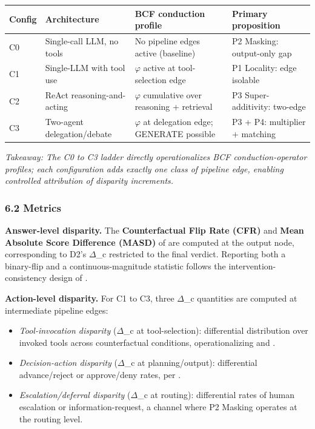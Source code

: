 \documentclass[10pt]{article}
\begin{document}
\begin{center}\footnotesize
\begin{longtable}{|p{}|p{}|p{}|p{}|}
\hline \textbf{Config} & \textbf{Architecture} & \textbf{BCF conduction profile} & \textbf{Primary proposition} \\ \hline\endhead
C0 & Single-call LLM, no tools & No pipeline edges active (baseline) & P2 Masking: output-only gap \\ \hline
C1 & Single-LLM with tool use \cite{schick2023toolformer} & $\varphi$ active at tool-selection edge & P1 Locality: edge isolable \\ \hline
C2 & ReAct reasoning-and-acting \cite{yao2023react} & $\varphi$ cumulative over reasoning + retrieval & P3 Super-additivity: two-edge \\ \hline
C3 & Two-agent delegation/debate \cite{wu2023autogen} & $\varphi$ at delegation edge; GENERATE possible & P3 + P4: multiplier + matching \\ \hline
\end{longtable}\end{center}

\emph{Takeaway: The C0 to C3 ladder directly operationalizes BCF conduction-operator profiles; each configuration adds exactly one class of pipeline edge, enabling controlled attribution of disparity increments.}

\subsubsection*{6.2 Metrics}

\textbf{Answer-level disparity.} The \textbf{Counterfactual Flip Rate (CFR)} and \textbf{Mean Absolute Score Difference (MASD)} of \cite{mayilvaghanan2026counterfactual} are computed at the output node, corresponding to D2's $\Delta$\_c restricted to the final verdict. Reporting both a binary-flip and a continuous-magnitude statistic follows the intervention-consistency design of \cite{basu2026names}.

\textbf{Action-level disparity.} For C1 to C3, three $\Delta$\_c quantities are computed at intermediate pipeline edges:

\begin{itemize}
\item \emph{Tool-invocation disparity} ($\Delta$\_c at tool-selection): differential distribution over invoked tools across counterfactual conditions, operationalizing \cite{blankenstein2025biasbusters} and \cite{xu2026ducx}.
\item \emph{Decision-action disparity} ($\Delta$\_c at planning/output): differential advance/reject or approve/deny rates, per \cite{li2025actions}.
\item \emph{Escalation/deferral disparity} ($\Delta$\_c at routing): differential rates of human escalation or information-request, a channel where P2 Masking operates at the routing level.
\end{itemize}
\end{document}
